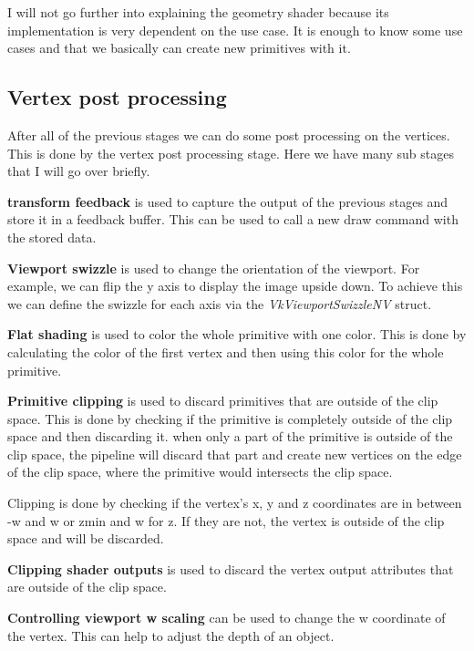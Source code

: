 \documentclass[12pt]{report} \usepackage{preamble}
\begin{document}
I will not go further into explaining the geometry shader because its
implementation is very dependent on the use case. It is enough to know
some use cases and that we basically can create new primitives with it.

\subsection{Vertex post processing}

After all of the previous stages we can do some post processing on the vertices.
This is done by the vertex post processing stage.
Here we have many sub stages that I will go over briefly.

\textbf{transform feedback} is used to capture the output of the previous stages
and store it in a feedback buffer. This can be used to
call a new draw command with the stored data. \cite{vertex-post-processing}

\textbf{Viewport swizzle} is used to change the orientation of the viewport.
For example, we can flip the y axis to display the image upside down.
To achieve this we can define the swizzle for each axis via the
\textit{VkViewportSwizzleNV} struct. \cite{vertex-post-processing}

\textbf{Flat shading} is used to color the whole primitive with one color.
This is done by calculating the color of the first vertex and then
using this color for the whole primitive. \cite{vertex-post-processing}

\textbf{Primitive clipping} is used to discard primitives that are outside of the clip space.
This is done by checking if the primitive is
completely outside of the clip space and then discarding it. \cite{vertex-post-processing}
when only a part of the primitive is outside of the clip space,
the pipeline will discard that part and create new vertices on the edge of the clip space,
where the primitive would intersects the clip space. \cite{vertex-post-processing}

Clipping is done by checking if the vertex's x, y and z coordinates
are in between -w and w or z\textunderscore min and w for z.
If they are not, the vertex is outside of the clip space and will be discarded.

\textbf{Clipping shader outputs} is used to discard the vertex output attributes
that are outside of the clip space.

\textbf{Controlling viewport w scaling} can be used to change the w coordinate of the vertex.
This can help to adjust the depth of an object.
\end{document}
